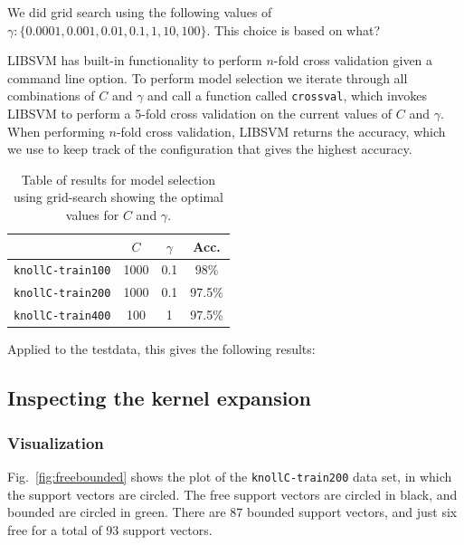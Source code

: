 \documentclass{article}
\begin{document}
We did grid search using the following values of $\gamma: \{ 0.0001, 0.001, 0.01, 0.1, 1, 10, 100 \}$. This choice is based on what?

LIBSVM has built-in functionality to perform $n$-fold cross validation
given a command line option. To perform model selection we iterate
through all combinations of $C$ and $\gamma$ and call a function
called \texttt{crossval}, which invokes LIBSVM to perform a 5-fold
cross validation on the current values of $C$ and $\gamma$. When
performing $n$-fold cross validation, LIBSVM returns the accuracy,
which we  use to keep track of the configuration that gives the
highest accuracy.

\begin{table}[!h]
  \centering
  \begin{tabular}{l | c | c | c }
    \hfill & $C$ & $\gamma$ & Acc.\\\hline
    \texttt{knollC-train100} & 1000 & 0.1 & 98\%\\
    \texttt{knollC-train200} & 1000 & 0.1 & 97.5\%\\
    \texttt{knollC-train400} & 100 & 1 & 97.5\%
  \end{tabular}
  \caption{Table of results for model selection using grid-search
    showing the optimal values for $C$ and $\gamma$.}
\end{table}

Applied to the testdata, this gives the following results:

\subsection{Inspecting the kernel expansion}

\subsubsection{Visualization}

Fig.~\ref{fig:freebounded} shows the plot of the \texttt{knollC-train200} data set, in which the support vectors are circled. The free support vectors are circled in black, and bounded are circled in green. There are 87 bounded support vectors, and just six free for a total of 93 support vectors.
\end{document}
